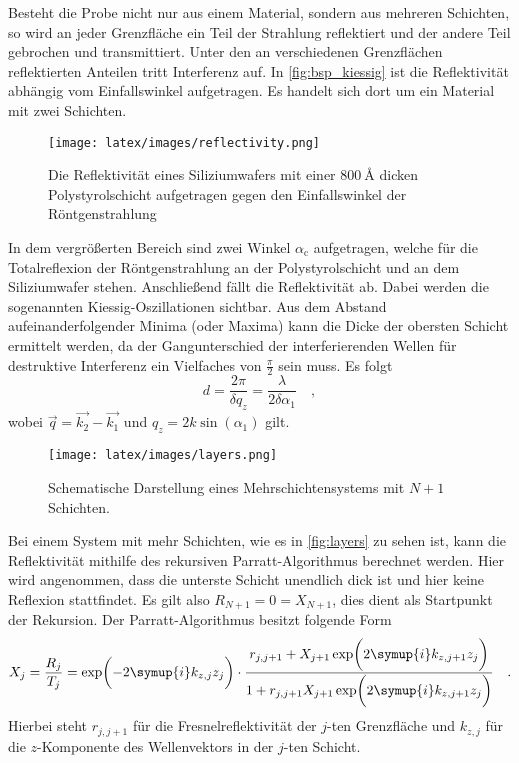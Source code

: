         \noindent 
        Besteht die Probe nicht nur aus einem Material, sondern aus mehreren Schichten, so wird an jeder Grenzfläche ein Teil der Strahlung reflektiert und 
        der andere Teil gebrochen und transmittiert. Unter den an verschiedenen Grenzflächen reflektierten Anteilen tritt Interferenz auf. In 
        \autoref{fig:bsp_kiessig} ist die Reflektivität abhängig vom Einfallswinkel aufgetragen. Es handelt sich dort um ein Material mit zwei Schichten. 
        \begin{figure}
            \centering
            \texttt{[image: latex/images/reflectivity.png]}
            \caption{Die Reflektivität eines Siliziumwafers mit einer $\SI{800}{\angstrom}$ dicken Polystyrolschicht aufgetragen gegen den Einfallswinkel der Röntgenstrahlung}
            \label{fig:bsp_kiessig}
        \end{figure}
        In dem vergrößerten Bereich sind zwei Winkel $\alpha_\text{c}$ aufgetragen, welche für die Totalreflexion der Röntgenstrahlung an der Polystyrolschicht 
        und an dem Siliziumwafer stehen. Anschließend fällt die Reflektivität ab. Dabei werden die sogenannten Kiessig-Oszillationen 
        sichtbar. Aus dem Abstand aufeinanderfolgender Minima (oder Maxima) kann die Dicke der obersten Schicht ermittelt werden, da der Gangunterschied 
        der interferierenden Wellen für destruktive Interferenz ein Vielfaches von $\frac{\pi}{2}$ sein muss. 
        Es folgt
        \begin{equation}
            d = \frac{2 \pi}{\delta q_z} = \frac{\lambda}{2 \delta \alpha_1}\quad , \label{eqn:bragg}
        \end{equation} 
        wobei $\vec{q} = \vec{k_2} - \vec{k_1}$ und $q_z = 2 k \sin(\alpha_1)$ gilt.

         
        \begin{figure}%
            \centering%
            \texttt{[image: latex/images/layers.png]}%
            \caption{Schematische Darstellung eines Mehrschichtensystems mit $N+1$ Schichten.}%
            \label{fig:layers}%
        \end{figure}
        \noindent
        Bei einem System mit mehr Schichten, wie es in \autoref{fig:layers} zu sehen ist, kann die Reflektivität mithilfe des rekursiven Parratt-Algorithmus 
        berechnet werden. Hier wird angenommen, dass die unterste Schicht unendlich dick ist und hier keine Reflexion stattfindet. Es gilt also 
        $R_{N+1} = 0 = X_{N+1}$, dies dient als Startpunkt der Rekursion. Der Parratt-Algorithmus besitzt folgende Form
        \begin{equation*}
            X_j = \frac{R_j}{T_j} = \exp\biggl( - 2 \symup{i} k_{z,j}z_j\biggr) \cdot \frac{r_{j, j+1} + X_{j+1}\exp\biggl(2 \symup{i} k_{z, j+1} z_j\biggr)}{1+ r_{j, j+1} X_{j+1}\exp\biggl(2 \symup{i} k_{z, j+1} z_j\biggr)}\quad .
        \end{equation*}
        Hierbei steht $r_{j, j+1}$ für die Fresnelreflektivität der $j$-ten Grenzfläche und $k_{z,j}$ für die $z$-Komponente des Wellenvektors in der $j$-ten Schicht. 

